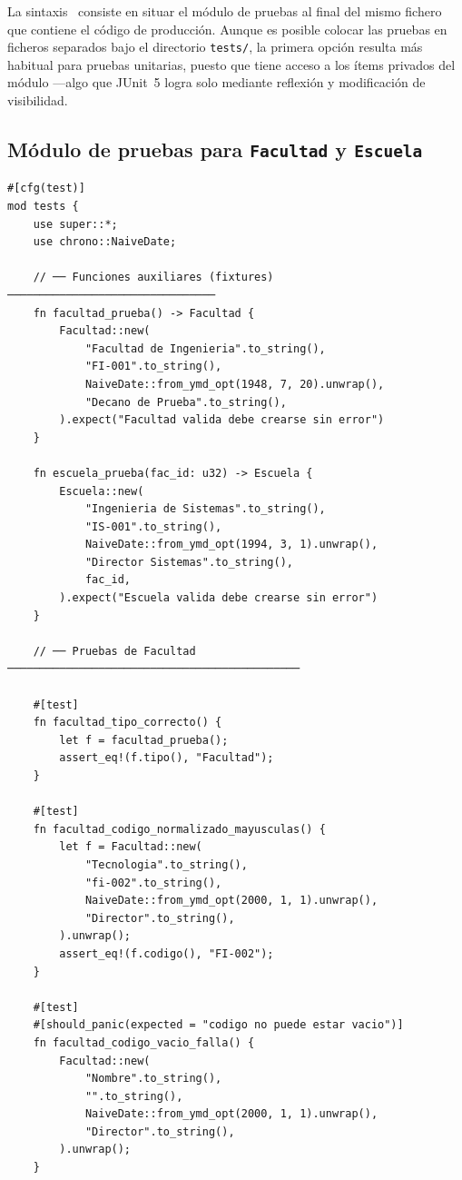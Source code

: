 \noindent
La sintaxis  \rust\ consiste en situar el módulo de pruebas al final
del mismo fichero que contiene el código de producción. Aunque es posible colocar las pruebas
en ficheros separados bajo el directorio \texttt{tests/}, la primera opción resulta más
habitual para pruebas unitarias, puesto que tiene acceso a los ítems privados del módulo
---algo que JUnit~5 logra solo mediante reflexión y modificación de visibilidad.

\subsection{Módulo de pruebas para \texttt{Facultad} y \texttt{Escuela}}
\label{subsec:rust-prueba-facultad-escuela}

\begin{lstlisting}[style=rustStyle,
  caption={Módulo de pruebas para los \textit{structs} \texttt{Facultad} y \texttt{Escuela} en \rust.},
  label={lst:rust-pruebas-facultad}]
#[cfg(test)]
mod tests {
    use super::*;
    use chrono::NaiveDate;

    // ── Funciones auxiliares (fixtures) ────────────────────────────────
    fn facultad_prueba() -> Facultad {
        Facultad::new(
            "Facultad de Ingenieria".to_string(),
            "FI-001".to_string(),
            NaiveDate::from_ymd_opt(1948, 7, 20).unwrap(),
            "Decano de Prueba".to_string(),
        ).expect("Facultad valida debe crearse sin error")
    }

    fn escuela_prueba(fac_id: u32) -> Escuela {
        Escuela::new(
            "Ingenieria de Sistemas".to_string(),
            "IS-001".to_string(),
            NaiveDate::from_ymd_opt(1994, 3, 1).unwrap(),
            "Director Sistemas".to_string(),
            fac_id,
        ).expect("Escuela valida debe crearse sin error")
    }

    // ── Pruebas de Facultad ─────────────────────────────────────────────

    #[test]
    fn facultad_tipo_correcto() {
        let f = facultad_prueba();
        assert_eq!(f.tipo(), "Facultad");
    }

    #[test]
    fn facultad_codigo_normalizado_mayusculas() {
        let f = Facultad::new(
            "Tecnologia".to_string(),
            "fi-002".to_string(),
            NaiveDate::from_ymd_opt(2000, 1, 1).unwrap(),
            "Director".to_string(),
        ).unwrap();
        assert_eq!(f.codigo(), "FI-002");
    }

    #[test]
    #[should_panic(expected = "codigo no puede estar vacio")]
    fn facultad_codigo_vacio_falla() {
        Facultad::new(
            "Nombre".to_string(),
            "".to_string(),
            NaiveDate::from_ymd_opt(2000, 1, 1).unwrap(),
            "Director".to_string(),
        ).unwrap();
    }


\end{lstlisting}
